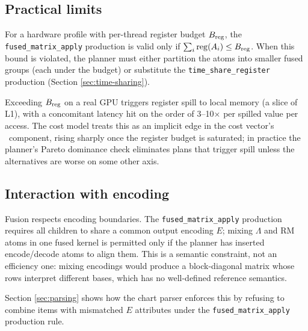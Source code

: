 \subsection{Practical limits}

\begin{proposition}
  \label{prop:reg-budget}
  For a hardware profile with per-thread register
  budget $B_{\operatorname{reg}}$, the \texttt{fused\_matrix\_apply}
  production is valid only if
  $\sum_i \operatorname{reg}(A_i) \leq B_{\operatorname{reg}}$. When this bound
  is violated, the planner must either partition the
  atoms into smaller fused groups (each under the
  budget) or substitute the \texttt{time\_share\_register}
  production (Section \ref{sec:time-sharing}).
\end{proposition}

\begin{remark}
  Exceeding $B_{\operatorname{reg}}$ on a real GPU triggers register
  spill to local memory (a slice of L1), with a
  concomitant latency hit on the order of 3--10$\times$
  per spilled value per access. The cost model treats
  this as an implicit edge in the cost vector's
  \LAT\ component, rising sharply once the register
  budget is saturated; in practice the planner's
  Pareto dominance check eliminates plans that trigger
  spill unless the alternatives are worse on some other
  axis.
\end{remark}

\subsection{Interaction with encoding}

Fusion respects encoding boundaries. The
\texttt{fused\_matrix\_apply} production requires all
children to share a common output encoding $E$; mixing
$\Lambda$ and RM atoms in one fused kernel is permitted
only if the planner has inserted encode/decode atoms to
align them. This is a semantic constraint, not an
efficiency one: mixing encodings would produce a
block-diagonal matrix whose rows interpret different
bases, which has no well-defined reference semantics.

Section \ref{sec:parsing} shows how the chart parser
enforces this by refusing to combine items with
mismatched $E$ attributes under the
\texttt{fused\_matrix\_apply} production rule.
